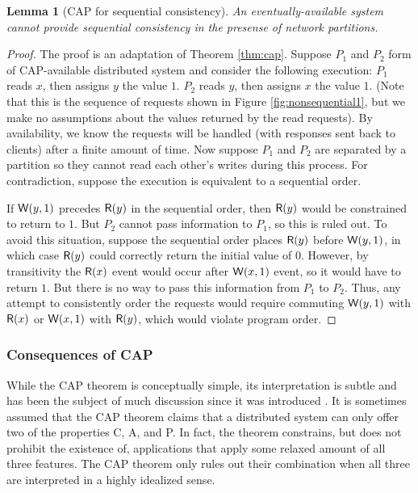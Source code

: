 \documentclass[]             %
{NASA}                       %
\newtheorem{lemma}[theorem]{Lemma}
\theoremstyle{definition}
\begin{document}
\begin{lemma}[CAP for sequential consistency]
  \label{thm:cap-sequential}
  An eventually-available system cannot provide sequential consistency in the presense of network partitions.
\end{lemma}
\begin{proof}
  The proof is an adaptation of Theorem \ref{thm:cap}. Suppose $P_1$ and
  $P_2$ form of CAP-available distributed system and consider the
  following execution: $P_1$ reads $x$, then assigns $y$ the value
  $1$. $P_2$ reads $y$, then assigns $x$ the value $1$. (Note that this
  is the sequence of requests shown in Figure \ref{fig:nonsequential1},
  but we make no assumptions about the values returned by the read
  requests). By availability, we know the requests will be handled (with
  responses sent back to clients) after a finite amount of time. Now
  suppose $P_1$ and $P_2$ are separated by a partition so they cannot
  read each other's writes during this process. For contradiction,
  suppose the execution is equivalent to a sequential order.

  If $\mathsf{W}\!\left(y, 1\right)$ precedes $\mathsf{R}\!\left(y\right)$ in the sequential order, then $\mathsf{R}\!\left(y\right)$ would
  be constrained to return to $1$. But $P_2$ cannot pass information to
  $P_1$, so this is ruled out. To avoid this situation, suppose the
  sequential order places $\mathsf{R}\!\left(y\right)$ before $\mathsf{W}\!\left(y, 1\right)$, in which case $\mathsf{R}\!\left(y\right)$
  could correctly return the initial value of $0$. However, by
  transitivity the $\mathsf{R}\!\left(x\right)$ event would occur after $\mathsf{W}\!\left(x, 1\right)$ event, so it
  would have to return $1$. But there is no way to pass this information
  from $P_1$ to $P_2$. Thus, any attempt to consistently order the
  requests would require commuting $\mathsf{W}\!\left(y, 1\right)$ with $\mathsf{R}\!\left(x\right)$ or $\mathsf{W}\!\left(x, 1\right)$ with
  $\mathsf{R}\!\left(y\right)$, which would violate program order.
\end{proof}

\subsubsection{Consequences of CAP}
\label{interpretation-of-the-cap-theorem}
While the CAP theorem is conceptually simple, its interpretation is
subtle and has been the subject of much discussion since it was
introduced \cite{2012CAP12Years}. It is sometimes assumed that the CAP
theorem claims that a distributed system can only offer two of the
properties C, A, and P.  In fact, the theorem constrains, but does not
prohibit the existence of, applications that apply some relaxed amount
of all three features. The CAP theorem only rules out their
combination when all three are interpreted in a highly idealized
sense.
\end{document}
